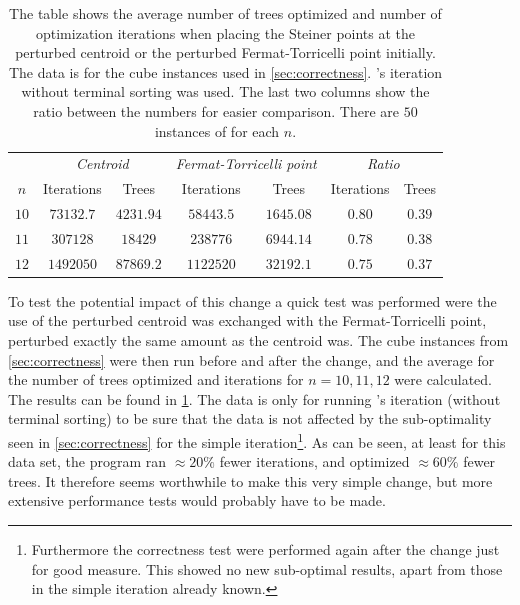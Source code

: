 \begin{table}[htbp]
  \centering
  \begin{tabular}{ccccccc}
    \toprule
         & \multicolumn{2}{c}{\footnotesize{\textit{Centroid}}}
         & \multicolumn{2}{c}{\footnotesize{\textit{Fermat-Torricelli point}}}
         & \multicolumn{2}{c}{\footnotesize{\textit{Ratio}}}                     \\
    $n$  & Iterations & Trees     & Iterations & Trees     & Iterations & Trees  \\
    \cmidrule(r){1-1}\cmidrule(lr){2-3}\cmidrule(lr){4-5}\cmidrule(l){6-7}
    $10$ & $73132.7$  & $4231.94$ & $58443.5$  & $1645.08$ & $0.80$     & $0.39$ \\ 
    $11$ & $307128$   & $18429$   & $238776$   & $6944.14$ & $0.78$     & $0.38$ \\
    $12$ & $1492050$  & $87869.2$ & $1122520$  & $32192.1$ & $0.75$     & $0.37$ \\
    \bottomrule
  \end{tabular}
  \caption[Perturbed centroid vs.\ perturbed Fermat-Torricelli point]{The table shows the average number of trees optimized and
    number of optimization iterations when placing the Steiner points at the perturbed
    centroid or the perturbed Fermat-Torricelli point initially. The data is for
    the cube instances used in \cref{sec:correctness}. \citeauthor{smith1992}'s iteration without terminal sorting was used. The last two columns
    show the ratio between the numbers for easier comparison. There are $50$
    instances of for each $n$.\label{tab:centroid-vs-fermat}}
\end{table}

To test the potential impact of this change a quick test was performed were the
use of the perturbed centroid was exchanged with the Fermat-Torricelli point,
perturbed exactly the same amount as the centroid was. The cube instances from
\cref{sec:correctness} were then run before and after the change, and the
average for the number of trees optimized and iterations for $n=10,11,12$ were
calculated. The results can be found in \cref{tab:centroid-vs-fermat}. The data
is only for running \citeauthor{smith1992}'s iteration (without terminal
sorting) to be sure that the data is not affected by the sub-optimality seen in
\cref{sec:correctness} for the simple iteration\footnote{Furthermore the
  correctness test were performed again after the change just for good measure.
  This showed no new sub-optimal results, apart from those in the simple
  iteration already known.}. As can be seen, at least for this data set, the
program ran $\approx 20\%$ fewer iterations, and optimized $\approx 60\%$ fewer
trees. It therefore seems worthwhile to make this very simple change, but more
extensive performance tests would probably have to be made.

